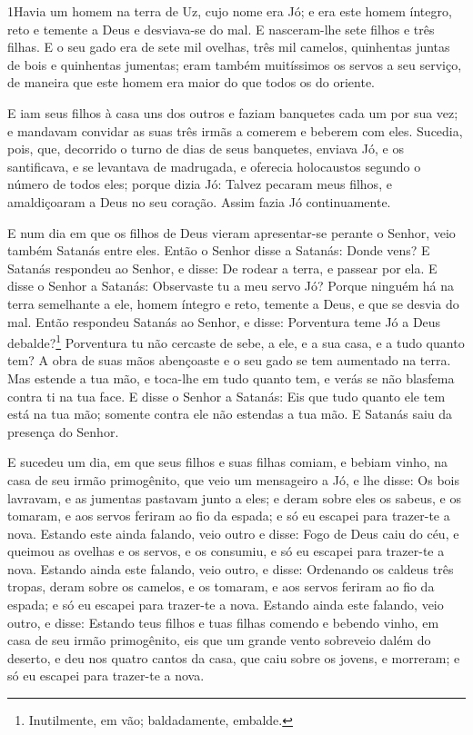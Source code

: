 
\lettrine{1} Havia um homem na terra de Uz, cujo nome era Jó;
e era este homem íntegro, reto e temente a Deus e desviava-se do
mal. E nasceram-lhe sete filhos e três filhas. E o seu gado
era de sete mil ovelhas, três mil camelos, quinhentas juntas de bois
e quinhentas jumentas; eram também muitíssimos os servos a seu
serviço, de maneira que este homem era maior do que todos os do
oriente.

E iam seus filhos à casa uns dos outros e faziam banquetes cada um
por sua vez; e mandavam convidar as suas três irmãs a comerem e
beberem com eles. Sucedia, pois, que, decorrido o turno de dias
de seus banquetes, enviava Jó, e os santificava, e se levantava de
madrugada, e oferecia holocaustos segundo o número de todos eles;
porque dizia Jó: Talvez pecaram meus filhos, e amaldiçoaram a Deus
no seu coração. Assim fazia Jó continuamente.

E num dia em que os filhos de Deus vieram apresentar-se perante o
Senhor, veio também Satanás entre eles. Então o Senhor disse a
Satanás: Donde vens? E Satanás respondeu ao Senhor, e disse: De
rodear a terra, e passear por ela. E disse o Senhor a Satanás:
Observaste tu a meu servo Jó? Porque ninguém há na terra semelhante
a ele, homem íntegro e reto, temente a Deus, e que se desvia do mal.
Então respondeu Satanás ao Senhor, e disse: Porventura teme Jó a
Deus debalde?\footnote{Inutilmente, em vão; baldadamente, embalde.}
Porventura tu não cercaste de sebe, a ele, e a sua casa, e a
tudo quanto tem? A obra de suas mãos abençoaste e o seu gado se tem
aumentado na terra. Mas estende a tua mão, e toca-lhe em tudo
quanto tem, e verás se não blasfema contra ti na tua face. E
disse o Senhor a Satanás: Eis que tudo quanto ele tem está na tua
mão; somente contra ele não estendas a tua mão. E Satanás saiu da
presença do Senhor.

E sucedeu um dia, em que seus filhos e suas filhas comiam, e
bebiam vinho, na casa de seu irmão primogênito, que veio um
mensageiro a Jó, e lhe disse: Os bois lavravam, e as jumentas
pastavam junto a eles; e deram sobre eles os sabeus, e os
tomaram, e aos servos feriram ao fio da espada; e só eu escapei para
trazer-te a nova. Estando este ainda falando, veio outro e
disse: Fogo de Deus caiu do céu, e queimou as ovelhas e os servos, e
os consumiu, e só eu escapei para trazer-te a nova. Estando
ainda este falando, veio outro, e disse: Ordenando os caldeus três
tropas, deram sobre os camelos, e os tomaram, e aos servos feriram
ao fio da espada; e só eu escapei para trazer-te a nova.
Estando ainda este falando, veio outro, e disse: Estando teus
filhos e tuas filhas comendo e bebendo vinho, em casa de seu irmão
primogênito, eis que um grande vento sobreveio dalém do
deserto, e deu nos quatro cantos da casa, que caiu sobre os jovens,
e morreram; e só eu escapei para trazer-te a nova.

